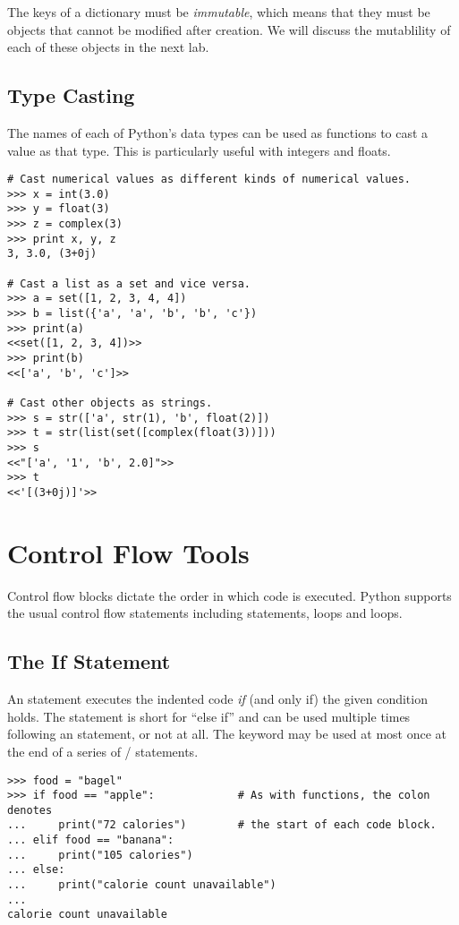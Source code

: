 The keys of a dictionary must be \emph{immutable}, which means that they must be objects that cannot be modified after creation.
We will discuss the mutablility of each of these objects in the next lab.

\subsection*{Type Casting}

The names of each of Python's data types can be used as functions to cast a value as that type.
This is particularly useful with integers and floats.
\begin{lstlisting}
# Cast numerical values as different kinds of numerical values.
>>> x = int(3.0)
>>> y = float(3)
>>> z = complex(3)
>>> print x, y, z
3, 3.0, (3+0j)

# Cast a list as a set and vice versa.
>>> a = set([1, 2, 3, 4, 4])
>>> b = list({'a', 'a', 'b', 'b', 'c'})
>>> print(a)
<<set([1, 2, 3, 4])>>
>>> print(b)
<<['a', 'b', 'c']>>

# Cast other objects as strings.
>>> s = str(['a', str(1), 'b', float(2)])
>>> t = str(list(set([complex(float(3))]))
>>> s
<<"['a', '1', 'b', 2.0]">>
>>> t
<<'[(3+0j)]'>>

\end{lstlisting}


\section*{Control Flow Tools}
Control flow blocks dictate the order in which code is executed.
Python supports the usual control flow statements including  statements,  loops and  loops.

\subsection*{The If Statement}
An  statement executes the indented code \emph{if} (and only if) the given condition holds.
The  statement is short for ``else if'' and can be used multiple times following an  statement, or not at all. 
The  keyword may be used at most once at the end of a series of / statements.
\begin{lstlisting}
>>> food = "bagel"         
>>> if food == "apple":             # As with functions, the colon denotes
...     print("72 calories")        # the start of each code block.
... elif food == "banana":
...     print("105 calories")
... else: 
...     print("calorie count unavailable")
...     
calorie count unavailable
\end{lstlisting}

